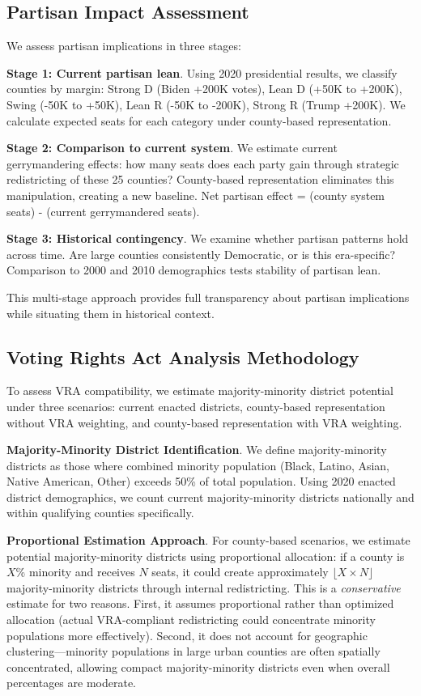 \subsection{Partisan Impact Assessment}

We assess partisan implications in three stages:

\textbf{Stage 1: Current partisan lean}. Using 2020 presidential results, we classify counties by margin: Strong D (Biden +200K votes), Lean D (+50K to +200K), Swing (-50K to +50K), Lean R (-50K to -200K), Strong R (Trump +200K). We calculate expected seats for each category under county-based representation.

\textbf{Stage 2: Comparison to current system}. We estimate current gerrymandering effects: how many seats does each party gain through strategic redistricting of these 25 counties? County-based representation eliminates this manipulation, creating a new baseline. Net partisan effect = (county system seats) - (current gerrymandered seats).

\textbf{Stage 3: Historical contingency}. We examine whether partisan patterns hold across time. Are large counties consistently Democratic, or is this era-specific? Comparison to 2000 and 2010 demographics tests stability of partisan lean.

This multi-stage approach provides full transparency about partisan implications while situating them in historical context.

\subsection{Voting Rights Act Analysis Methodology}

To assess VRA compatibility, we estimate majority-minority district potential under three scenarios: current enacted districts, county-based representation without VRA weighting, and county-based representation with VRA weighting.

\textbf{Majority-Minority District Identification}. We define majority-minority districts as those where combined minority population (Black, Latino, Asian, Native American, Other) exceeds 50\% of total population. Using 2020 enacted district demographics, we count current majority-minority districts nationally and within qualifying counties specifically.

\textbf{Proportional Estimation Approach}. For county-based scenarios, we estimate potential majority-minority districts using proportional allocation: if a county is $X$\% minority and receives $N$ seats, it could create approximately $\lfloor X \times N \rfloor$ majority-minority districts through internal redistricting. This is a \emph{conservative} estimate for two reasons. First, it assumes proportional rather than optimized allocation (actual VRA-compliant redistricting could concentrate minority populations more effectively). Second, it does not account for geographic clustering---minority populations in large urban counties are often spatially concentrated, allowing compact majority-minority districts even when overall percentages are moderate.

